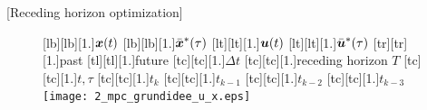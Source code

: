 \newpage
[Receding horizon optimization]
\begin{figure}[h]
\centering
    [lb][lb][1.]{$\boldsymbol{x}(t)$}
		[lb][lb][1.]{$\bar{\boldsymbol{x}}^\ast(\tau)$}
		[lt][lt][1.]{$\boldsymbol{u}(t)$}
		[lt][lt][1.]{$\bar{\boldsymbol{u}}^\ast(\tau)$}
		[tr][tr][1.]{past}
		[tl][tl][1.]{future}
		[tc][tc][1.]{$\Delta t$}
		[tc][tc][1.]{receding horizon $T$}
		[tc][tc][1.]{$t,\tau$}
		[tc][tc][1.]{$t_k$}
		[tc][tc][1.]{$t_{k-1}$}
		[tc][tc][1.]{$t_{k-2}$}
		[tc][tc][1.]{$t_{k-3}$}
	\texttt{[image: 2\_mpc\_grundidee\_u\_x.eps]}
	\label{fig:2_mpc_grundidee_u_x}
\end{figure}











